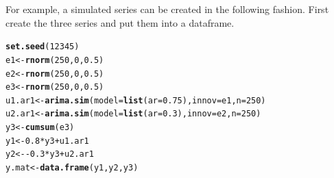 \documentclass{article}\usepackage{graphicx, color}
\makeatletter
\newcommand{\hlfunctioncall}[1]{\textcolor[rgb]{0.501960784313725,0,0.329411764705882}{\textbf{#1}}}%
\newenvironment{kframe}{%
 \def\at@end@of@kframe{}%
 \ifinner\ifhmode%
  \def\at@end@of@kframe{\end{minipage}}%
  \begin{minipage}{\columnwidth}%
 \fi\fi%
 \def\FrameCommand##1{\hskip\@totalleftmargin \hskip-\fboxsep
 \colorbox{shadecolor}{##1}\hskip-\fboxsep
     \hskip-\linewidth \hskip-\@totalleftmargin \hskip\columnwidth}%
 \MakeFramed {\advance\hsize-\width
   \@totalleftmargin\z@ \linewidth\hsize
   \@setminipage}}%
 {\par\unskip\endMakeFramed%
 \at@end@of@kframe}
\newenvironment{knitrout}{}{} %
\makeatother
\begin{document}
For example, a simulated series can be created in the following fashion. First create the three series and put them into a dataframe.  
\begin{knitrout}
\color{fgcolor}\begin{kframe}
\begin{alltt}
\hlfunctioncall{set.seed}(12345)
e1 <- \hlfunctioncall{rnorm}(250, 0, 0.5)
e2 <- \hlfunctioncall{rnorm}(250, 0, 0.5)
e3 <- \hlfunctioncall{rnorm}(250, 0, 0.5)
u1.ar1 <- \hlfunctioncall{arima.sim}(model = \hlfunctioncall{list}(ar = 0.75), innov = e1, n = 250)
u2.ar1 <- \hlfunctioncall{arima.sim}(model = \hlfunctioncall{list}(ar = 0.3), innov = e2, n = 250)
y3 <- \hlfunctioncall{cumsum}(e3)
y1 <- 0.8 * y3 + u1.ar1
y2 <- -0.3 * y3 + u2.ar1
y.mat <- \hlfunctioncall{data.frame}(y1, y2, y3)
\end{alltt}
\end{kframe}
\end{knitrout}
\end{document}
